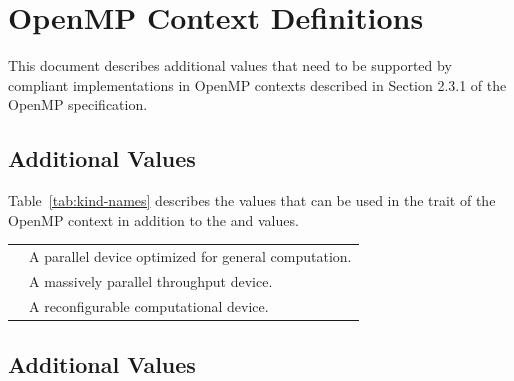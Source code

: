     \setcounter{page}{0}
    \linenumbers
    
\chapter{OpenMP \relatedomp{} Context Definitions}
    
This document describes additional values that need to be supported by compliant implementations in OpenMP contexts described in Section 2.3.1 of the OpenMP \relatedomp{} specification.

\section{Additional  Values}
    
Table~\ref{tab:kind-names} describes the  values that can be used in the  trait of the OpenMP context in addition to the  and  values.
    
\nolinenumbers
\renewcommand{\arraystretch}{1.5}
\tablelasttail{\hline}
\begin{supertabular}{p{1in}p{3in}}
  & A parallel device optimized for general computation.\\
  & A massively parallel throughput device.\\
 & A reconfigurable computational device.\\
\end{supertabular}
\linenumbers

\vspace{1cm}

\section{Additional  Values}

